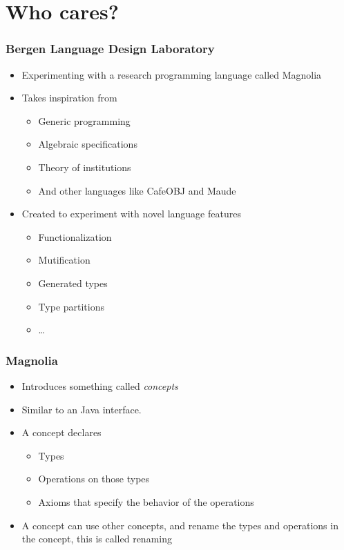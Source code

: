 \section{Who cares?}
\SectionPage

\begin{frame}
  \frametitle{Bergen Language Design Laboratory}
  \begin{itemize}
    \item Experimenting with a research programming language called Magnolia
    \pause
    \item Takes inspiration from
    \pause
    \begin{itemize}
      \item Generic programming
      \pause
      \item Algebraic specifications
      \pause
      \item Theory of institutions
      \pause
      \item And other languages like CafeOBJ and Maude
      \pause
    \end{itemize}
    \item Created to experiment with novel language features
    \begin{itemize}
      \item Functionalization
      \pause
      \item Mutification
      \pause
      \item Generated types
      \pause
      \item Type partitions
      \pause
      \item \dots
    \end{itemize}
  \end{itemize}
\end{frame}

\begin{frame}
  \frametitle{Magnolia}
  \begin{itemize}
    \item Introduces something called \textit{concepts}
    \pause
    \item Similar to an Java interface.
    \pause
    \item A concept declares
    \begin{itemize}
      \item Types
      \pause
      \item Operations on those types
      \pause
      \item Axioms that specify the behavior of the operations
      \pause
    \end{itemize}
    \item A concept can use other concepts, and rename the types and operations
      in the concept, this is called renaming
  \end{itemize}
\end{frame}

